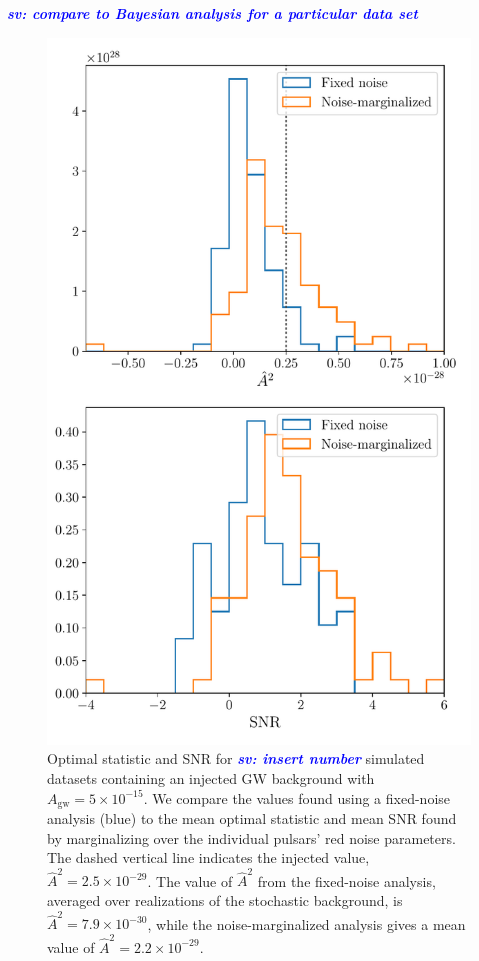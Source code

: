 \documentclass[twocolumn,aps,prd,superscriptaddress]{revtex4-1}
\newcommand{\sv}[1]{\textcolor{blue}{\it{\textbf{sv: #1}}} }
\newcommand{\Agw}{\ensuremath{A_\mathrm{gw}}}
\begin{document}
\sv{compare to Bayesian analysis for a particular data set}

\begin{figure}[ht]
	\includegraphics[width=\columnwidth]{plots/os_datasetstats_5e-15.pdf}
	\caption{Optimal statistic and SNR for \sv{insert number} simulated datasets 
			containing an injected GW background with $\Agw = 5\times10^{-15}$. 
			We compare the values found using a fixed-noise analysis (blue) to the 
			mean optimal statistic and mean SNR found by marginalizing over 
			the individual pulsars' red noise parameters. The dashed vertical line 
			indicates the injected value, $\hat{A}^2 = 2.5 \times 10^{-29}$. 
			The value of $\hat{A}^2$ from the fixed-noise analysis, 
			averaged over realizations of the stochastic background, is $\hat{A}^2 = 7.9 \times 10^{-30}$, 
			while the noise-marginalized analysis gives a mean value of $\hat{A}^2 = 2.2 \times 10^{-29}$.}
	\label{fig:os_datasetstats}
\end{figure}
\end{document}
